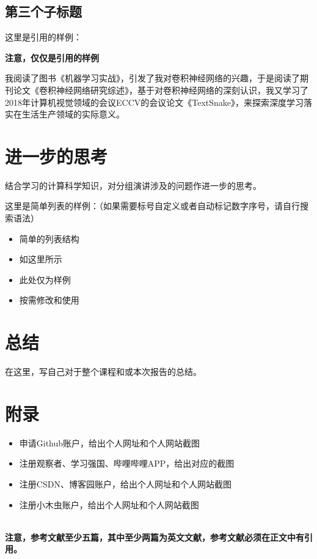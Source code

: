 \documentclass{article}
\begin{document}
\subsection{第三个子标题}
这里是引用的样例：\par
{\bf 注意，仅仅是引用的样例}\par
我阅读了图书《机器学习实战》\citep{Harrington2013}，引发了我对卷积神经网络的兴趣，于是阅读了期刊论文《卷积神经网络研究综述》\citep{zhoufeiyan}，基于对卷积神经网络的深刻认识，我又学习了2018年计算机视觉领域的会议ECCV的会议论文《TextSnake》\citep{long2018textsnake}，来探索深度学习落实在生活生产领域的实际意义。\par

\section{进一步的思考}
结合学习的计算科学知识，对分组演讲涉及的问题作进一步的思考。\par

这里是简单列表的样例：（如果需要标号自定义或者自动标记数字序号，请自行搜索语法）
\begin{itemize}
    \item 简单的列表结构 
    \item 如这里所示
    \item 此处仅为样例
    \item 按需修改和使用
\end{itemize}


\section{总结}
在这里，写自己对于整个课程和或本次报告的总结。\par


\section{附录}
\begin{itemize}
    \item 申请Github账户，给出个人网址和个人网站截图
    \item 注册观察者、学习强国、哔哩哔哩APP，给出对应的截图
    \item 注册CSDN、博客园账户，给出个人网址和个人网站截图
    \item 注册小木虫账户，给出个人网址和个人网站截图
\end{itemize}


\hspace*{\fill} \\

{\bf 注意，参考文献至少五篇，其中至少两篇为英文文献，参考文献必须在正文中有引用。}


\end{document}
